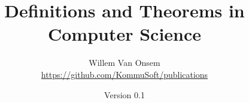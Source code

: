 \documentclass{book}
\title{Definitions and Theorems in Computer Science}
\author{Willem Van Onsem\\\url{https://github.com/KommuSoft/publications}}
\date{Version 0.1}
\newtheorem{theo}{Theorem}
\begin{document}
\begin{titlepage}
\maketitle
\end{titlepage}
\tableofcontents
\newpage









\begin{twocolumn}


\printindex
\end{twocolumn}
\end{document}
